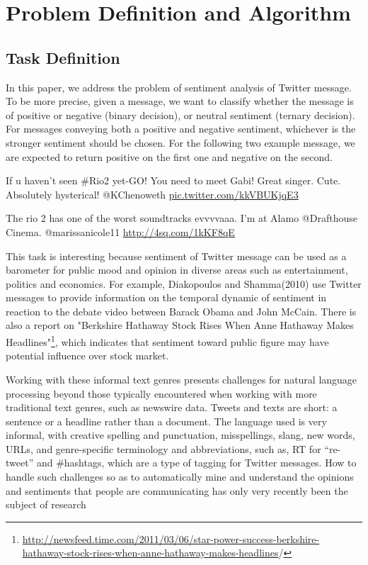 \section{Problem Definition and Algorithm}
\subsection{Task Definition}
In this paper, we address the problem of sentiment analysis of Twitter message. To be more precise, 
given a message, we want to classify whether the message is of positive or negative (binary decision), or neutral sentiment (ternary decision). For messages conveying both a positive and negative sentiment, whichever is the stronger sentiment should be chosen. For the following two example message, we are expected to return positive on the first one and negative on the second. 
\begin{mdframed}[
  leftmargin=\parindent,
  rightmargin=\parindent,
  skipabove=\topsep,
  skipbelow=\topsep
  ]
  If u haven't seen \#Rio2 yet-GO! You need to meet Gabi! Great singer. Cute. Absolutely hysterical! @KChenoweth \url{pic.twitter.com/kkVBUKjqE3}
\end{mdframed}

\begin{mdframed}[
  leftmargin=\parindent,
  rightmargin=\parindent,
  skipabove=\topsep,
  skipbelow=\topsep
  ]
 The rio 2 has one of the worst soundtracks evvvvaaa. I'm at Alamo @Drafthouse Cinema. @marissanicole11 \url{http://4sq.com/1kKF8qE} 
\end{mdframed}

This task is interesting because sentiment of Twitter message can be used as a barometer for public mood and opinion in diverse areas such as entertainment, politics and economics. For example, 
Diakopoulos and Shamma(2010) use Twitter messages to provide information on the temporal dynamic of sentiment in reaction to the debate video between Barack Obama and John McCain. There is also a report on "Berkshire Hathaway Stock Rises When Anne Hathaway Makes Headlines"\footnote{\url{http://newsfeed.time.com/2011/03/06/star-power-success-berkshire-hathaway-stock-rises-when-anne-hathaway-makes-headlines}/}, which indicates that sentiment toward public figure may have potential influence over stock market. 



Working with these informal text genres presents challenges for natural language processing beyond those typically encountered when working with more traditional text genres, such as newswire data.  Tweets and texts are short: a sentence or a headline rather than a document.  The language used is very informal, with creative spelling and punctuation, misspellings, slang, new words, URLs, and genre-specific terminology and abbreviations, such as, RT for “re-tweet” and \#hashtags, which are a type of tagging for Twitter messages.  How to handle such challenges so as to automatically mine and understand the opinions and sentiments that people are communicating has only very recently been the subject of research


